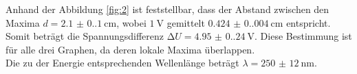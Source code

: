 Anhand der Abbildung \ref{fig:2} ist feststellbar, dass der Abstand zwischen den Maxima $d=\qty{2.1(0.1)}{\centi\meter}$, 
wobei $\qty{1}{\volt}$ gemittelt $\qty{0.424(0.004)}{\centi\meter}$ entspricht. Somit beträgt die Spannungsdifferenz 
$\increment U=\qty{4.95(0.24)}{\volt}$. Diese Bestimmung ist für alle drei Graphen, da deren lokale Maxima überlappen.\\

Die zu der Energie entsprechenden Wellenlänge beträgt $\lambda=\qty{250(12)}{\nano\meter}$.

